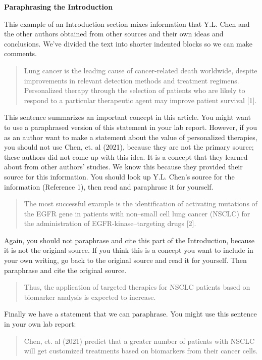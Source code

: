 \documentclass[
]{book}
\begin{document}
\textbf{Paraphrasing the Introduction}

This example of an Introduction section mixes information that Y.L. Chen and the other authors obtained from other sources and their own ideas and conclusions. We've divided the text into shorter indented blocks so we can make comments.

\begin{quote}
Lung cancer is the leading cause of cancer-related death worldwide, despite improvements in relevant detection methods and treatment regimens. Personalized therapy through the selection of patients who are likely to respond to a particular therapeutic agent may improve patient survival {[}1{]}.
\end{quote}

This sentence summarizes an important concept in this article. You might want to use a paraphrased version of this statement in your lab report. However, if you as an author want to make a statement about the value of personalized therapies, you should not use Chen, et. al (2021), because they are not the primary source; these authors did not come up with this idea. It is a concept that they learned about from other authors' studies. We know this because they provided their source for this information. You should look up Y.L. Chen's source for the information (Reference 1), then read and paraphrase it for yourself.

\begin{quote}
The most successful example is the identification of activating mutations of the EGFR gene in patients with non--small cell lung cancer (NSCLC) for the administration of EGFR-kinase--targeting drugs {[}2{]}.
\end{quote}

Again, you should not paraphrase and cite this part of the Introduction, because it is not the original source. If you think this is a concept you want to include in your own writing, go back to the original source and read it for yourself. Then paraphrase and cite the original source.

\begin{quote}
Thus, the application of targeted therapies for NSCLC patients based on biomarker analysis is expected to increase.
\end{quote}

Finally we have a statement that we can paraphrase. You might use this sentence in your own lab report:

\begin{quote}
Chen, et. al (2021) predict that a greater number of patients with NSCLC will get customized treatments based on biomarkers from their cancer cells.
\end{quote}
\end{document}
